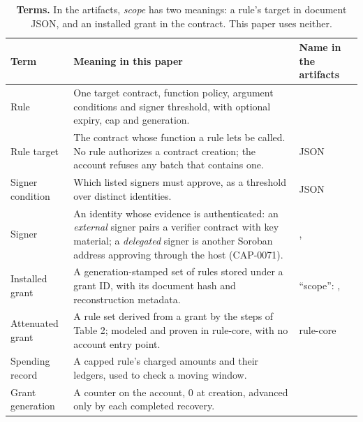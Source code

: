 \begin{table}[tbp]
\centering
\caption{\textbf{Terms.} In the artifacts, \emph{scope} has two meanings: a rule's target in document JSON, and an installed grant in the contract. This paper uses neither.}\label{tab:tab-1}
\footnotesize\begin{tabularx}{\linewidth}{@{}LLL@{}}
\toprule
\textbf{Term} & \textbf{Meaning in this paper} & \textbf{Name in the artifacts} \\
\midrule
Rule & One target contract, function policy, argument conditions and signer threshold, with optional expiry, cap and generation. &  \\
Rule target & The contract whose function a rule lets be called. No rule authorizes a contract creation; the account refuses any batch that contains one. & JSON  \\
Signer condition & Which listed signers must approve, as a threshold over distinct identities. & JSON  \\
Signer & An identity whose evidence is authenticated: an \emph{external} signer pairs a verifier contract with key material; a \emph{delegated} signer is another Soroban address approving through the host (CAP-0071). & ,  \\
Installed grant & A generation-stamped set of rules stored under a grant ID, with its document hash and reconstruction metadata. & ``scope'': ,  \\
Attenuated grant & A rule set derived from a grant by the steps of Table 2; modeled and proven in rule-core, with no account entry point. & rule-core  \\
Spending record & A capped rule's charged amounts and their ledgers, used to check a moving window. &  \\
Grant generation & A counter on the account, 0 at creation, advanced only by each completed recovery. &  \\
\bottomrule
\end{tabularx}
\end{table}
